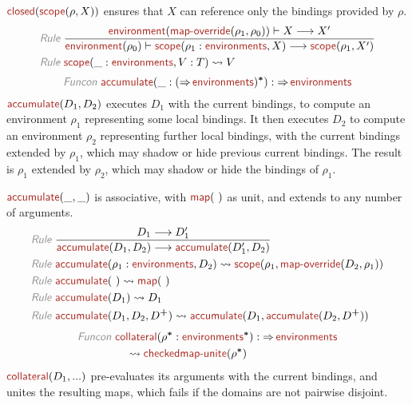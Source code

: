 \documentclass[fleqn]{article}
\newcommand{\KEY}[1]{\textsf{\textit{\color{Gray}#1}}}
\newcommand{\NAME}[2][\PLAIN]{#1{Name_#2}{\textsf{\color{Mahogany}#2}}}
\newcommand{\PLAIN}[1]{}
\newcommand{\PLUS}{^{\text{\bf+}}}
\newcommand{\STAR}{^{\boldsymbol{\ast}}}
\newcommand{\RULE}[2]{\frac{#1}{#2}}
\newcommand{\TO}{\mathop{\Rightarrow}}
\newcommand{\TRANS}{\longrightarrow}
\begin{document}
$ \NAME{closed}(\NAME{scope}(\rho, X)) $ ensures that $ X $ can reference only the bindings
provided by $ \rho $.
% 
\begin{align*}
  \KEY{Rule} ~ 
  & \RULE{
    \NAME{environment}(\NAME{map-override}(\rho_1, \rho_0)) \vdash X \TRANS X'
    }{
    \NAME{environment}(\rho_0) \vdash \NAME{scope}(\rho_1:\NAME{environments}, X) \TRANS \NAME{scope}(\rho_1, X')
    }
\\
  \KEY{Rule} ~
  & \NAME{scope}(\_:\NAME{environments}, V:T) \leadsto V
\end{align*}
% 
\[ %
\KEY{Funcon} ~
  \NAME{accumulate}(\_:(\TO \NAME{environments})\STAR) : \TO \NAME{environments}
\] %
% 
$ \NAME{accumulate}(D_1, D_2) $ executes $ D_1 $ with the current bindings, to compute an
environment $ \rho_1 $ representing some local bindings. It then executes $ D_2 $ to
compute an environment $ \rho_2 $ representing further local bindings, with the
current bindings extended by $ \rho_1 $, which may shadow or hide previous
current bindings. The result is $ \rho_1 $ extended by $ \rho_2 $, which may shadow
or hide the bindings of $ \rho_1 $.

$ \NAME{accumulate}(\_, \_) $ is associative, with $ \NAME{map}(~) $ as unit, and extends to any
number of arguments.
% 
\begin{align*}
  \KEY{Rule} ~ 
  & \RULE{
    D_1 \TRANS D_1'
    }{
    \NAME{accumulate}(D_1, D_2) \TRANS \NAME{accumulate}(D_1', D_2)
    }
\\
  \KEY{Rule} ~
  & \NAME{accumulate}(\rho_1:\NAME{environments}, D_2) \leadsto \NAME{scope}(\rho_1, \NAME{map-override}(D_2, \rho_1))
\\
  \KEY{Rule} ~
  & \NAME{accumulate}(~) \leadsto \NAME{map}(~)
\\
  \KEY{Rule} ~
  & \NAME{accumulate}(D_1) \leadsto D_1
\\
  \KEY{Rule} ~
  & \NAME{accumulate}(D_1, D_2, D\PLUS) \leadsto \NAME{accumulate}(D_1, \NAME{accumulate}(D_2, D\PLUS))
\end{align*}
% 
\begin{align*}
  \KEY{Funcon} ~
  & \NAME{collateral}(\rho\STAR:\NAME{environments}\STAR) : \TO \NAME{environments}
\\
  & \quad {} \leadsto \NAME{checked} \NAME{map-unite}(\rho\STAR)
   \end{align*}
% 
$ \NAME{collateral}(D_1, ...) $ pre-evaluates its arguments with the current bindings,
and unites the resulting maps, which fails if the domains are not pairwise
disjoint.
\end{document}
